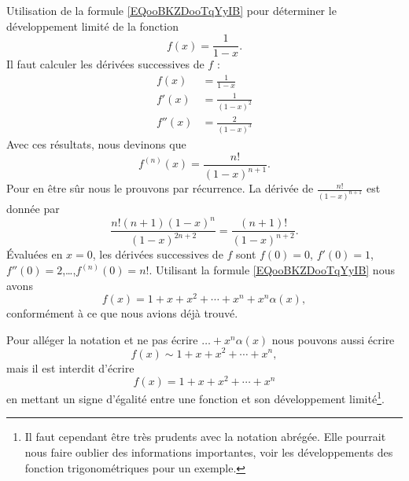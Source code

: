 \begin{example}
    Utilisation de la formule \eqref{EQooBKZDooTqYyIB} pour déterminer le développement limité de la fonction
    \begin{equation}
        f(x)=\frac{1}{ 1-x }.
    \end{equation}
    Il faut calculer les dérivées successives de \( f\) :
    \begin{subequations}
        \begin{align}
            f(x)&=\frac{1}{ 1-x }\\
            f'(x)&=\frac{ 1 }{ (1-x)^2 }\\
            f''(x)&=\frac{ 2 }{ (1-x)^3 }
        \end{align}
    \end{subequations}
    Avec ces résultats, nous devinons que 
    \begin{equation}
        f^{(n)}(x)=\frac{ n! }{ (1-x)^{n+1} }.
    \end{equation}
    Pour en être sûr nous le prouvons par récurrence. La dérivée de \(\frac{ n! }{ (1-x)^{n+1} } \) est donnée par
    \begin{equation}
        \frac{ n!(n+1)(1-x)^n }{ (1-x)^{2n+2} }=\frac{(n+1)! }{ (1-x)^{n+2} }.
    \end{equation}
    Évaluées en \( x=0\), les dérivées successives de \( f\) sont \( f(0)=0\), \( f'(0)=1\), \( f''(0)=2\),\ldots,\( f^{(n)}(0)=n!\). Utilisant la formule \eqref{EQooBKZDooTqYyIB} nous avons
    \begin{equation}
        f(x)=1+x+x^2+\cdots +x^n+x^n\alpha(x),
    \end{equation}
    conformément à ce que nous avions déjà trouvé.
\end{example}
\begin{remark}
  Pour alléger la notation et ne pas écrire \(\ldots +x^n\alpha(x)\) nous pouvons aussi écrire
    \begin{equation}
         f(x)\sim 1+x+x^2+\cdots +x^n,
    \end{equation}
    mais il est interdit d'écrire
    \begin{equation}
         f(x)= 1+x+x^2+\cdots +x^n
    \end{equation}
    en mettant un signe d'égalité entre une fonction et son développement limité\footnote{Il faut cependant \^etre très prudents avec la notation abrégée. Elle pourrait nous faire oublier des informations importantes, voir les développements des fonction trigonométriques pour un exemple.}.
\end{remark}

